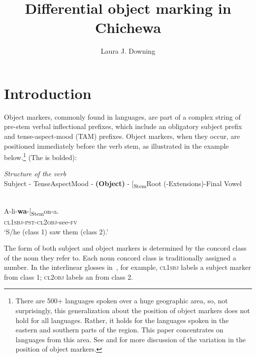 \documentclass[output=paper]{LSP/langsci}
\author{Laura J. Downing \affiliation{Göteborgs universitet}}
\title{Differential object marking in {C}hichewa}
\begin{document}
\section{Introduction}\label{02-do-sec:1}

Object markers, commonly found in  languages, are part of a
complex string of pre-stem verbal inflectional prefixes, which include
an obligatory subject prefix and tense-aspect-mood (TAM) prefixes.
Object markers, when they occur, are positioned immediately before the
verb stem, as illustrated in the  example below.\footnote{There
 are 500+  languages spoken over a huge geographic area, so, not
 surprisingly, this generalization about the position of object
 markers does not hold for all  languages. Rather, it holds for
 the languages spoken in the eastern and southern parts of the 
 region. This paper concentrates on languages from this area. See
\citet{Martenetal2012Object} and \citet{Beaudoinetal2004Pronominal}
 for more discussion of the variation in the position of object markers.}
(The  is bolded):

\begin{exe}
\ex
\begin{xlist}
\ex
\label{02-do-ex:1}%
\textit{Structure of the  verb} \citep{Meeussen1967Bantu, Nurse2003Aspect}\\
Subject - TenseAspectMood - \textbf{(Object)} - [\textsubscript{Stem}Root (-Extensions)-Final Vowel

\ex
\label{02-do-ex:1b}%
\\
\gll A-li-\textbf{wa}-[\textsubscript{Stem}on-a.\\
\textsc{cl}1\textsc{sbj}-\textsc{pst}-\textsc{cl}2\textsc{obj}-see-\textsc{fv}\\
\glt ‘S/he (class 1) saw them (class 2).’
\end{xlist}
\end{exe}

\noindent The form of both subject and object markers is determined by the concord class of the noun they refer to. 
Each noun concord class is traditionally assigned a number. 
In the interlinear glosses in~, for example, \textsc{cl}1\textsc{sbj} labels a subject marker from class 1; \textsc{cl}2\textsc{obj} labels an  from class 2.
\end{document}
